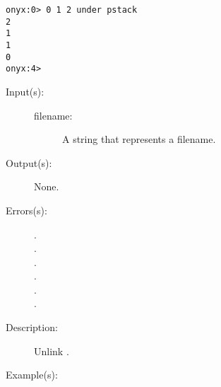 \begin{description}
\begin{description}
\begin{verbatim}
onyx:0> 0 1 2 under pstack
2
1
1
0
onyx:4>
		\end{verbatim}
	\end{description}
\label{systemdict:unlink}
\item[{\onyxop{filename}{unlink}{--}}: ]
	\begin{description}\item[]
	\item[Input(s): ]
		\begin{description}\item[]
		\item[filename: ]
			A string that represents a filename.
		\end{description}
	\item[Output(s): ] None.
	\item[Errors(s): ]
		\begin{description}\item[]
		\item[.]
		\item[.]
		\item[.]
		\item[.]
		\item[.]
		\item[.]
		\end{description}
	\item[Description: ]
		Unlink .
	\item[Example(s): ]\begin{verbatim}


\end{verbatim}
\end{description}
\end{description}
